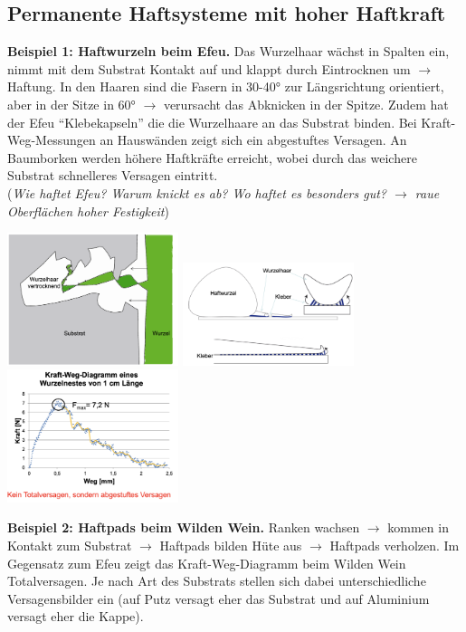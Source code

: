 \subsection{Permanente Haftsysteme mit hoher Haftkraft}

\textbf{Beispiel 1: Haftwurzeln beim Efeu.} Das Wurzelhaar wächst in Spalten ein, nimmt mit dem Substrat Kontakt auf und klappt durch Eintrocknen um $\rightarrow$ Haftung. In den Haaren sind die Fasern in 30-40° zur Längsrichtung orientiert, aber in der Sitze in 60° $\rightarrow$ verursacht das Abknicken in der Spitze. Zudem hat der Efeu ``Klebekapseln'' die die Wurzelhaare an das Substrat binden. Bei Kraft-Weg-Messungen an Hauswänden zeigt sich ein abgestuftes Versagen. An Baumborken werden höhere Haftkräfte erreicht, wobei durch das weichere Substrat schnelleres Versagen eintritt.
\\
(\dangersign\textit{Wie haftet Efeu? Warum knickt es ab? Wo haftet es besonders gut? $\rightarrow$ raue Oberflächen hoher Festigkeit})

\begin{center}
    \includegraphics[width=5cm]{lec4/figures/efeu_haar.png}
    \hfill
    \includegraphics[width=5cm]{lec4/figures/efeu_kleber.png}
    \hfill
    \includegraphics[width=5cm]{lec4/figures/efeu_versagen.png}
\end{center}
\textbf{Beispiel 2: Haftpads beim Wilden Wein.} Ranken wachsen $\rightarrow$ kommen in Kontakt zum Substrat $\rightarrow$ Haftpads bilden Hüte aus $\rightarrow$ Haftpads verholzen. Im Gegensatz zum Efeu zeigt das Kraft-Weg-Diagramm beim Wilden Wein Totalversagen. Je nach Art des Substrats stellen sich dabei unterschiedliche Versagensbilder ein (auf Putz versagt eher das Substrat und auf Aluminium versagt eher die Kappe).

